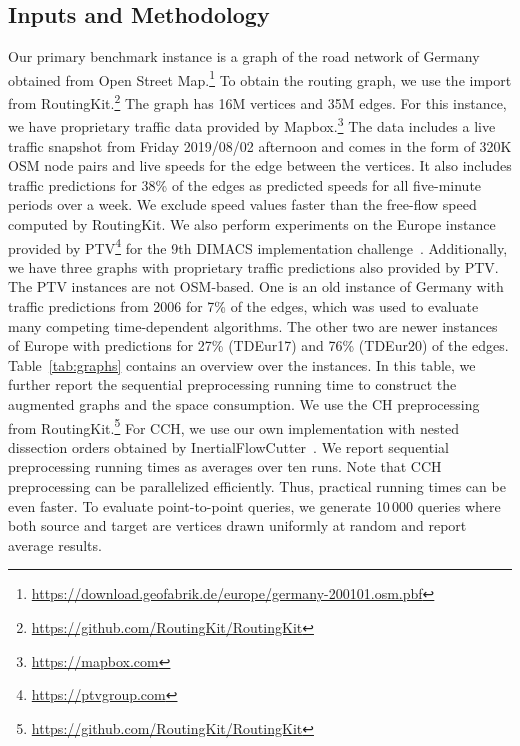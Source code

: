 \documentclass[manuscript]{acmart}
\begin{document}
\subsection{Inputs and Methodology}
Our primary benchmark instance is a graph of the road network of Germany obtained from Open Street Map.\footnote{\url{https://download.geofabrik.de/europe/germany-200101.osm.pbf}}
To obtain the routing graph, we use the import from RoutingKit.\footnote{\url{https://github.com/RoutingKit/RoutingKit}}
The graph has 16M vertices and 35M edges.
For this instance, we have proprietary traffic data provided by Mapbox.\footnote{\url{https://mapbox.com}}
The data includes a live traffic snapshot from Friday 2019/08/02 afternoon and comes in the form of 320K OSM node pairs and live speeds for the edge between the vertices.
It also includes traffic predictions for 38\% of the edges as predicted speeds for all five-minute periods over a week.
We exclude speed values faster than the free-flow speed computed by RoutingKit.
We also perform experiments on the Europe instance provided by PTV\footnote{\url{https://ptvgroup.com}} for the 9th DIMACS implementation challenge~\cite{DemetrescuGJ09}.
Additionally, we have three graphs with proprietary traffic predictions also provided by PTV.
The PTV instances are not OSM-based.
One is an old instance of Germany with traffic predictions from 2006 for 7\% of the edges, which was used to evaluate many competing time-dependent algorithms.
The other two are newer instances of Europe with predictions for 27\% (TDEur17) and 76\% (TDEur20) of the edges.
Table~\ref{tab:graphs} contains an overview over the instances.
In this table, we further report the sequential preprocessing running time to construct the augmented graphs and the space consumption.
We use the CH preprocessing from RoutingKit.\footnote{\url{https://github.com/RoutingKit/RoutingKit}}
For CCH, we use our own implementation with nested dissection orders obtained by InertialFlowCutter~\cite{GottesburenHUW19}.
We report sequential preprocessing running times as averages over ten runs.
Note that CCH preprocessing can be parallelized efficiently.
Thus, practical running times can be even faster.
To evaluate point-to-point queries, we generate 10\,000 queries where both source and target are vertices drawn uniformly at random and report average results.

\begin{table}
\centering
\caption{
Instances used in the evaluation with sequential preprocessing running times to construct (C)CH-Potentials.
With CCH-Potentials, $w_{\ell}$ can be updated by rerunning Phase 2.
}\label{tab:graphs}

\end{table}
\end{document}
